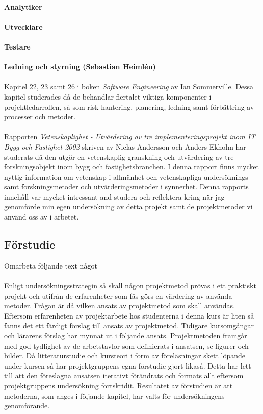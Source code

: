 \documentclass[conference]{IEEEtran}
\begin{document}
\\
\textbf{Analytiker}\\
\\
\textbf{Utvecklare}\\
\\
\textbf{Testare}\\
\\
\textbf{Ledning och styrning (Sebastian Heimlén)}\\
\\
Kapitel 22, 23 samt 26 i boken \textit{Software Engineering} av Ian Sommerville\cite{Sommerville10}. Dessa kapitel studerades då de behandlar flertalet viktiga komponenter i projektledarrollen, så som risk-hantering, planering, ledning samt förbättring av processer och metoder.\\
\\
Rapporten \textit{Vetenskaplighet - Utvärdering av tre implementeringsprojekt inom IT Bygg och Fastighet 2002} skriven av Niclas Andersson och Anders Ekholm\cite{Andersson02} har studerats då den utgör en vetenskaplig granskning och utvärdering av tre forskningsobjekt inom bygg och fastighetsbranchen. I denna rapport finns mycket nyttig information om vetenskap i allmänhet och vetenskapliga undersöknings- samt forskningsmetoder och utvärderingsmetoder i synnerhet. Denna rapports innehåll var mycket intressant and studera och reflektera kring när jag genomförde min egen undersökning av detta projekt samt de projektmetoder vi använd oss av i arbetet.
\subsection{Förstudie}
Omarbeta följande text något\\
\\
Enligt undersökningsstrategin så skall någon projektmetod prövas i ett praktiskt projekt och utifrån de erfarenheter som fås görs en värdering av använda metoder. Frågan är då vilken ansats av projektmetod som skall användas. Eftersom erfarenheten av projektarbete hos studenterna i denna kurs är liten så fanns det ett färdigt förslag till ansats av projektmetod. Tidigare kursomgångar och lärarens förslag har mynnat ut i följande ansats. Projektmetoden framgår med god tydlighet av de arbetstavlor som definierats i ansatsen, se figurer och bilder. Då litteraturstudie och kursteori i form av föreläsningar skett löpande under kursen så har projektgruppens egna förstudie gjort likaså. Detta har lett till att den föreslagna ansatsen iterativt förändrats och formats allt eftersom projektgruppens undersökning fortskridit.
Resultatet av förstudien är att metoderna, som anges i följande kapitel, har valts för undersökningens genomförande.
\end{document}
